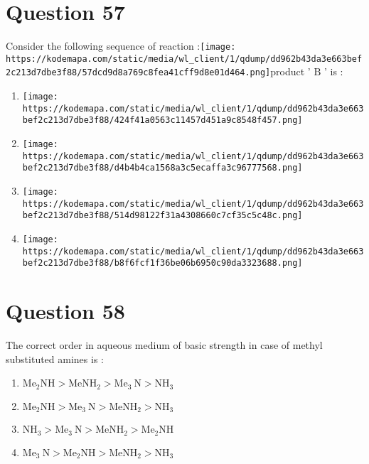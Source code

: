 \documentclass{article}
\begin{document}
\section*{Question 57}
Consider the following sequence of reaction :\texttt{[image: https://kodemapa.com/static/media/wl\_client/1/qdump/dd962b43da3e663bef2c213d7dbe3f88/57dcd9d8a769c8fea41cff9d8e01d464.png]}\newlineThe product ' \(\mathrm{B}\) ' is : 
\begin{enumerate}[label=(\alph*)]
\item \texttt{[image: https://kodemapa.com/static/media/wl\_client/1/qdump/dd962b43da3e663bef2c213d7dbe3f88/424f41a0563c11457d451a9c8548f457.png]}
\item \texttt{[image: https://kodemapa.com/static/media/wl\_client/1/qdump/dd962b43da3e663bef2c213d7dbe3f88/d4b4b4ca1568a3c5ecaffa3c96777568.png]}
\item \texttt{[image: https://kodemapa.com/static/media/wl\_client/1/qdump/dd962b43da3e663bef2c213d7dbe3f88/514d98122f31a4308660c7cf35c5c48c.png]}
\item \texttt{[image: https://kodemapa.com/static/media/wl\_client/1/qdump/dd962b43da3e663bef2c213d7dbe3f88/b8f6fcf1f36be06b6950c90da3323688.png]}
\end{enumerate}
\newpage
\section*{Question 58}
The correct order in aqueous medium of basic strength in case of methyl substituted amines is : 
\begin{enumerate}[label=(\alph*)]
\item \(\mathrm{Me}_2 \mathrm{NH}>\mathrm{MeNH}_2>\mathrm{Me}_3 \mathrm{~N}>\mathrm{NH}_3\)
\item \(\mathrm{Me}_2 \mathrm{NH}>\mathrm{Me}_3 \mathrm{~N}>\mathrm{MeNH}_2>\mathrm{NH}_3\)
\item \(\mathrm{NH}_3>\mathrm{Me}_3 \mathrm{~N}>\mathrm{MeNH}_2>\mathrm{Me}_2 \mathrm{NH}\)
\item \(\mathrm{Me}_3 \mathrm{~N}>\mathrm{Me}_2 \mathrm{NH}>\mathrm{MeNH}_2>\mathrm{NH}_3\)
\end{enumerate}
\newpage
\end{document}
